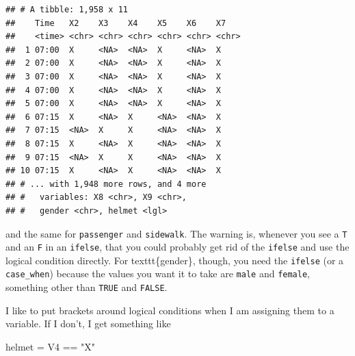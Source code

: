 \documentclass[]{tufte-book}
\newenvironment{Shaded}{}{}
\newcommand{\DataTypeTok}[1]{\textcolor[rgb]{0.56,0.13,0.00}{#1}}
\newcommand{\KeywordTok}[1]{\textcolor[rgb]{0.00,0.44,0.13}{\textbf{#1}}}
\newcommand{\NormalTok}[1]{#1}
\newcommand{\OperatorTok}[1]{\textcolor[rgb]{0.40,0.40,0.40}{#1}}
\newcommand{\StringTok}[1]{\textcolor[rgb]{0.25,0.44,0.63}{#1}}
\theoremstyle{definition}
\theoremstyle{definition}
\theoremstyle{definition}
\theoremstyle{remark}
\begin{document}
\begin{Shaded}
\end{Shaded}

\begin{verbatim}
## # A tibble: 1,958 x 11
##    Time   X2    X3    X4    X5    X6    X7   
##    <time> <chr> <chr> <chr> <chr> <chr> <chr>
##  1 07:00  X     <NA>  <NA>  X     <NA>  X    
##  2 07:00  X     <NA>  <NA>  X     <NA>  X    
##  3 07:00  X     <NA>  <NA>  X     <NA>  X    
##  4 07:00  X     <NA>  <NA>  X     <NA>  X    
##  5 07:00  X     <NA>  <NA>  X     <NA>  X    
##  6 07:15  X     <NA>  X     <NA>  <NA>  X    
##  7 07:15  <NA>  X     X     <NA>  <NA>  X    
##  8 07:15  X     <NA>  X     <NA>  <NA>  X    
##  9 07:15  <NA>  X     X     <NA>  <NA>  X    
## 10 07:15  X     <NA>  X     <NA>  <NA>  X    
## # ... with 1,948 more rows, and 4 more
## #   variables: X8 <chr>, X9 <chr>,
## #   gender <chr>, helmet <lgl>
\end{verbatim}

and the same for \texttt{passenger} and \texttt{sidewalk}. The warning
is, whenever you see a \texttt{T} and an \texttt{F} in an
\texttt{ifelse}, that you could probably get rid of the \texttt{ifelse}
and use the logical condition directly.
For texttt\{gender\}, though, you need the \texttt{ifelse} (or a
\texttt{case\_when}) because the values you want it to take are
\texttt{male} and \texttt{female}, something other than \texttt{TRUE}
and \texttt{FALSE}.

I like to put brackets around logical conditions when I am assigning
them to a variable. If I don't, I get something like

\begin{Shaded}
\begin{Highlighting}[]
\NormalTok{helmet =}\StringTok{ }\NormalTok{V4 }\OperatorTok{==}\StringTok{ "X"}
\end{Highlighting}
\end{Shaded}
\end{document}

